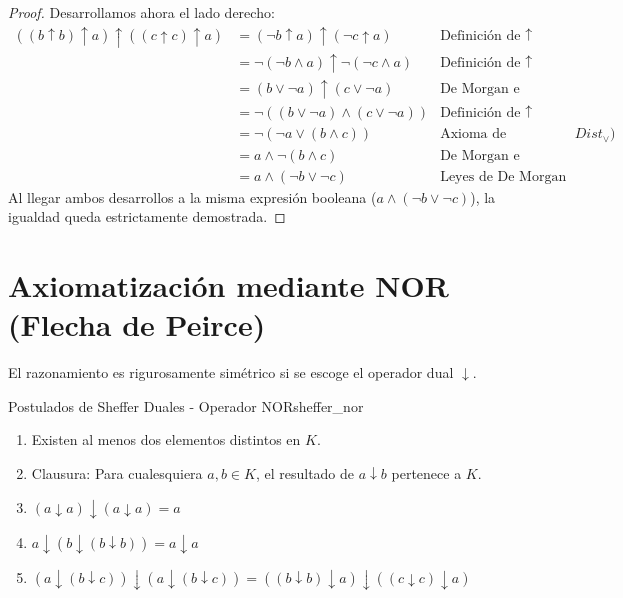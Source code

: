 \begin{proof}
Desarrollamos ahora el lado derecho:
\begin{align*}
((b \uparrow b) \uparrow a) \uparrow ((c \uparrow c) \uparrow a) &= (\neg b \uparrow a) \uparrow (\neg c \uparrow a) & \text{Definición de } \uparrow \\
&= \neg (\neg b \wedge a) \uparrow \neg (\neg c \wedge a) & \text{Definición de } \uparrow \\
&= (b \vee \neg a) \uparrow (c \vee \neg a) & \text{De Morgan e Involución} \\
&= \neg ((b \vee \neg a) \wedge (c \vee \neg a)) & \text{Definición de } \uparrow \\
&= \neg (\neg a \vee (b \wedge c)) & \text{Axioma de Distributividad ($Dist_\vee$)} \\
&= a \wedge \neg (b \wedge c) & \text{De Morgan e Involución} \\
&= a \wedge (\neg b \vee \neg c) & \text{Leyes de De Morgan}
\end{align*}
Al llegar ambos desarrollos a la misma expresión booleana ($a \wedge (\neg b \vee \neg c)$), la igualdad queda estrictamente demostrada.
\end{proof}

\section{Axiomatización mediante NOR (Flecha de Peirce)}

El razonamiento es rigurosamente simétrico si se escoge el operador dual $\downarrow$.

\begin{teorema}{Postulados de Sheffer Duales - Operador NOR}{sheffer_nor}
\begin{enumerate}
    \item Existen al menos dos elementos distintos en $K$.
    \item Clausura: Para cualesquiera $a, b \in K$, el resultado de $a \downarrow b$ pertenece a $K$.
    \item $(a \downarrow a) \downarrow (a \downarrow a) = a$
    \item $a \downarrow (b \downarrow (b \downarrow b)) = a \downarrow a$
    \item $(a \downarrow (b \downarrow c)) \downarrow (a \downarrow (b \downarrow c)) = ((b \downarrow b) \downarrow a) \downarrow ((c \downarrow c) \downarrow a)$
\end{enumerate}
\end{teorema}

